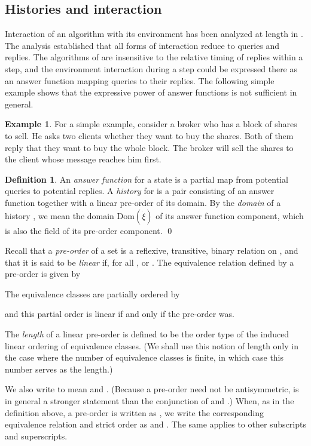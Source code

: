 \documentclass{LMCS}
\theoremstyle{definition}
\newtheorem{df}[thm]{Definition}
\newtheorem{ex}[thm]{Example}
\newcommand{\ans}{\dot}
\newcommand{\dom}[1]{\ensuremath{{\text{Dom}}(#1)}}
\begin{document}
\subsection{Histories and interaction}  \label{hist}

Interaction of an algorithm with its environment has been analyzed at
length in \cite{oa1}.  The analysis established that all forms of
interaction reduce to queries and replies.  The algorithms of
\cite{oa1,oa2,oa3} are insensitive to the relative timing of replies
within a step, and the environment interaction during a step could be
expressed there as an answer function mapping queries to their
replies.  The following simple example shows that the expressive power of
answer functions is not sufficient in general.

\begin{ex}\label{ex:broker} For a simple example, consider a
  broker who has a block of shares to sell.  He asks two clients
  whether they want to buy the shares.  Both of them reply that they
  want to buy the whole block.  The broker will sell the shares to the
  client whose message reaches him first.
\end{ex}

\begin{df}       \label{ans-fn}
An \emph{answer function} for a state  is a partial map from
potential queries to potential replies.  A \emph{history} for  is a
pair  consisting of an answer function
 together with a linear pre-order  of its domain.
By the \emph{domain} of a history , we mean the domain
\dom{\ans\xi} of its answer function component, which is also the
field of its pre-order component.
\qed\end{df}

Recall that a \emph{pre-order} of a set  is a reflexive,
transitive, binary relation on , and that it is said to be
\emph{linear} if, for all ,  or .  The
equivalence relation defined by a pre-order is given by

The equivalence classes are partially ordered by

and this partial order is linear if and only if the pre-order was.

The \emph{length} of a linear pre-order is defined to be the order
type of the induced linear ordering of equivalence classes.  (We shall
use this notion of length only in the case where the number of
equivalence classes is finite, in which case this number serves as the
length.)

We also write  to mean  and .  (Because a
pre-order need not be antisymmetric,  is in general a stronger
statement than the conjunction of  and .)  When, as
in the definition above, a pre-order is written as , we
write the corresponding equivalence relation and strict order as
 and .  The same applies to other subscripts and
superscripts.
\end{document}
